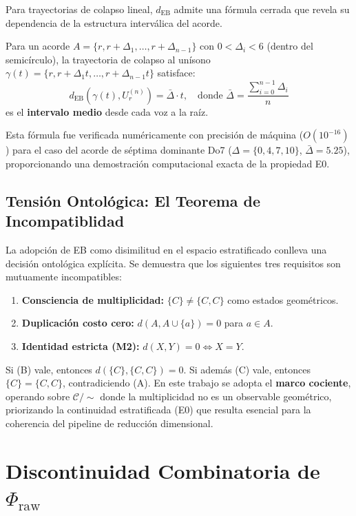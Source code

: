 Para trayectorias de colapso lineal, $d_{\text{EB}}$ admite una fórmula cerrada que revela su dependencia de la estructura interválica del acorde.

\begin{proposition}
Para un acorde $A = \{r, r+\Delta_1, \ldots, r+\Delta_{n-1}\}$ con $0 < \Delta_i < 6$ (dentro del semicírculo), la trayectoria de colapso al unísono $\gamma(t) = \{r, r+\Delta_1 t, \ldots, r+\Delta_{n-1} t\}$ satisface:
\begin{equation}
d_{\text{EB}}(\gamma(t), U_r^{(n)}) = \bar{\Delta} \cdot t, \quad \text{donde } \bar{\Delta} = \frac{\sum_{i=0}^{n-1} \Delta_i}{n}
\end{equation}
es el \textbf{intervalo medio} desde cada voz a la raíz.
\end{proposition}

Esta fórmula fue verificada numéricamente con precisión de máquina ($O(10^{-16})$) para el caso del acorde de séptima dominante Do7 ($\Delta = \{0, 4, 7, 10\}$, $\bar{\Delta} = 5.25$), proporcionando una demostración computacional exacta de la propiedad E0.

\subsection{Tensión Ontológica: El Teorema de Incompatiblidad}

La adopción de EB como disimilitud en el espacio estratificado conlleva una decisión ontológica explícita. Se demuestra que los siguientes tres requisitos son mutuamente incompatibles:
\begin{enumerate}
\item[(A)] \textbf{Consciencia de multiplicidad:} $\{C\} \neq \{C, C\}$ como estados geométricos.
\item[(B)] \textbf{Duplicación costo cero:} $d(A, A \cup \{a\}) = 0$ para $a \in A$.
\item[(C)] \textbf{Identidad estricta (M2):} $d(X, Y) = 0 \iff X = Y$.
\end{enumerate}

Si (B) vale, entonces $d(\{C\}, \{C,C\}) = 0$. Si además (C) vale, entonces $\{C\} = \{C,C\}$, contradiciendo (A). En este trabajo se adopta el \textbf{marco cociente}, operando sobre $\mathcal{C}/\!\!\sim$ donde la multiplicidad no es un observable geométrico, priorizando la continuidad estratificada (E0) que resulta esencial para la coherencia del pipeline de reducción dimensional.

\section{Discontinuidad Combinatoria de $\Phi_{\text{raw}}$}
\label{sec:discontinuidad_phi}

